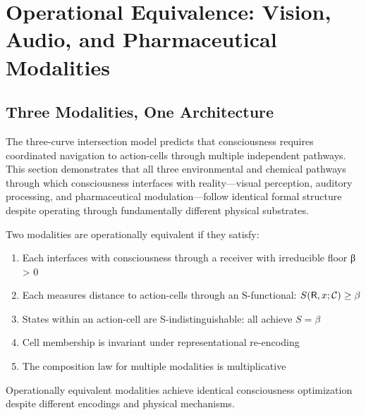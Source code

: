 \section{Operational Equivalence: Vision, Audio, and Pharmaceutical Modalities}
\label{sec:operational-equivalence}

\subsection{Three Modalities, One Architecture}

The three-curve intersection model predicts that consciousness requires coordinated navigation to action-cells through multiple independent pathways. This section demonstrates that all three environmental and chemical pathways through which consciousness interfaces with reality—visual perception, auditory processing, and pharmaceutical modulation—follow identical formal structure despite operating through fundamentally different physical substrates.

\begin{definition}
\label{def:operational-equiv}
Two modalities are operationally equivalent if they satisfy:
\begin{enumerate}[label=(\roman*),leftmargin=*]
\item Each interfaces with consciousness through a receiver with irreducible floor β > 0
\item Each measures distance to action-cells through an S-functional: $S(\mathsf{R}, x; \mathcal{C}) \geq \beta$
\item States within an action-cell are S-indistinguishable: all achieve $S = \beta$
\item Cell membership is invariant under representational re-encoding
\item The composition law for multiple modalities is multiplicative
\end{enumerate}

Operationally equivalent modalities achieve identical consciousness optimization despite different encodings and physical mechanisms.
\end{definition}

